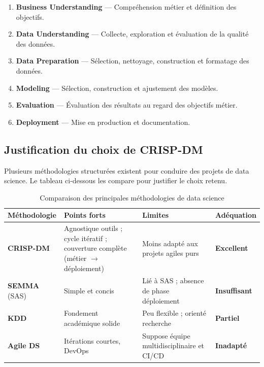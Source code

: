 \begin{enumerate}
  \item \textbf{Business Understanding} --- Compréhension métier et définition des objectifs.
  \item \textbf{Data Understanding} --- Collecte, exploration et évaluation de la qualité
    des données.
  \item \textbf{Data Preparation} --- Sélection, nettoyage, construction et formatage des
    données.
  \item \textbf{Modeling} --- Sélection, construction et ajustement des modèles.
  \item \textbf{Evaluation} --- Évaluation des résultats au regard des objectifs métier.
  \item \textbf{Deployment} --- Mise en production et documentation.
\end{enumerate}

\subsection{Justification du choix de CRISP-DM}

Plusieurs méthodologies structurées existent pour conduire des projets de data science.
Le tableau ci-dessous les compare pour justifier le choix retenu.

\begin{table}[H]
\centering
\caption{Comparaison des principales méthodologies de data science}
\label{tab:methodo_compare}
\begin{tabular}{p{2.3cm}p{3.4cm}p{3.4cm}p{3.2cm}}
\toprule
\textbf{Méthodologie} & \textbf{Points forts} & \textbf{Limites}
  & \textbf{Adéquation} \\
\midrule
\textbf{CRISP-DM} &
  Agnostique outils ; cycle itératif ; couverture complète (métier $\to$ déploiement) &
  Moins adapté aux projets agiles purs &
  \textbf{Excellent} \\[0.3cm]
\textbf{SEMMA} (SAS) &
  Simple et concis &
  Lié à SAS ; absence de phase déploiement &
  \textbf{Insuffisant} \\[0.3cm]
\textbf{KDD} &
  Fondement académique solide &
  Peu flexible ; orienté recherche &
  \textbf{Partiel} \\[0.3cm]
\textbf{Agile DS} &
  Itérations courtes, DevOps &
  Suppose équipe multidisciplinaire et CI/CD &
  \textbf{Inadapté} \\
\bottomrule
\end{tabular}
\end{table}

